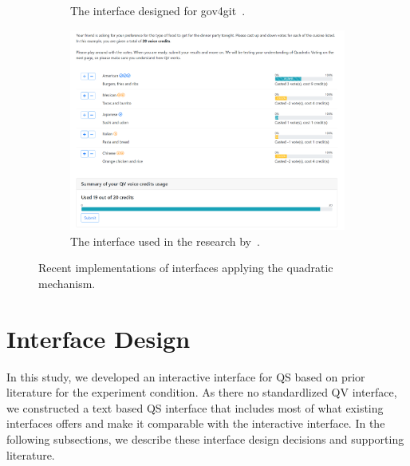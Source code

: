 \begin{figure}[h]
\begin{subfigure}[b]{0.3\textwidth}
        \caption{The interface designed for gov4git~\cite{Gov4gitDecentralizedPlatform2023}.}
        \label{fig:gov4gitInterface}
    \end{subfigure}
    \begin{subfigure}[b]{0.3\textwidth}
        \centering
        \includegraphics[width=\textwidth]{content/image/curr_interface/cheng_qv.png}
        \caption{The interface used in the research by~\textcite{chengCanShowWhat2021}.}
        \label{fig:chengInterface}
    \end{subfigure}
    \caption{Recent implementations of interfaces applying the quadratic mechanism.}
    \label{fig:qv_interface_external}
\end{figure}

\section{Interface Design}
\label{sec:interfaceDesign}
In this study, we developed an interactive interface for QS based on prior literature for the experiment condition. As there no standardlized QV interface, we constructed a text based QS interface that includes most of what existing interfaces offers and make it comparable with the interactive interface. In the following subsections, we describe these interface design decisions and supporting literature.

